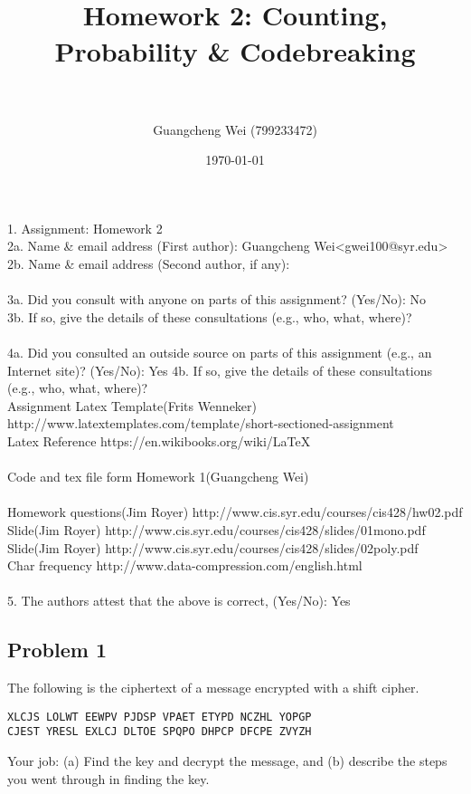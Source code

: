 \documentclass[paper=a4, fontsize=11pt]{scrartcl} %
\title{ 
\horrule{0.5pt} \\[0.4cm] %
\huge Homework 2: Counting, Probability \& Codebreaking \\ %
\horrule{2pt} \\[0.5cm] %
}
\author{Guangcheng Wei (799233472)} %
\date{\normalsize\today} %
\numberwithin{equation}{section} %
\numberwithin{figure}{section} %
\newcommand{\problem}[1]{\subsection *{Problem #1}}
\begin{document}
\maketitle %

1.  Assignment: Homework 2\\

2a. Name \& email address (First author): Guangcheng Wei<gwei100@syr.edu> \\
2b. Name \& email address (Second author, if any):\\
\\
3a. Did you consult with anyone on parts of this assignment? (Yes/No): No\\
3b. If so, give the details of these consultations (e.g., who, what,    where)?\\
\\
4a. Did you consulted an outside source on parts of this assignment     (e.g., an Internet site)?  (Yes/No): Yes
4b. If so, give the details of these consultations (e.g., who, what,     where)?
\\
Assignment Latex Template(Frits Wenneker) http://www.latextemplates.com/template/short-sectioned-assignment\\
Latex Reference https://en.wikibooks.org/wiki/LaTeX\\
\\
Code and tex file form Homework 1(Guangcheng Wei)\\
\\
Homework questions(Jim Royer) http://www.cis.syr.edu/courses/cis428/hw02.pdf\\
Slide(Jim Royer) http://www.cis.syr.edu/courses/cis428/slides/01mono.pdf\\
Slide(Jim Royer) http://www.cis.syr.edu/courses/cis428/slides/02poly.pdf\\
Char frequency http://www.data-compression.com/english.html\\
\\
5.  The authors attest that the above is correct, (Yes/No): Yes\\

\pagebreak
\problem 1 The following is the ciphertext of a message encrypted with a shift
cipher.
\begin{lstlisting}
XLCJS LOLWT EEWPV PJDSP VPAET ETYPD NCZHL YOPGP
CJEST YRESL EXLCJ DLTOE SPQPO DHPCP DFCPE ZVYZH
\end{lstlisting}
Your job: (a) Find the key and decrypt the message, and (b) describe
the steps you went through in finding the key.\\\\
\end{document}
